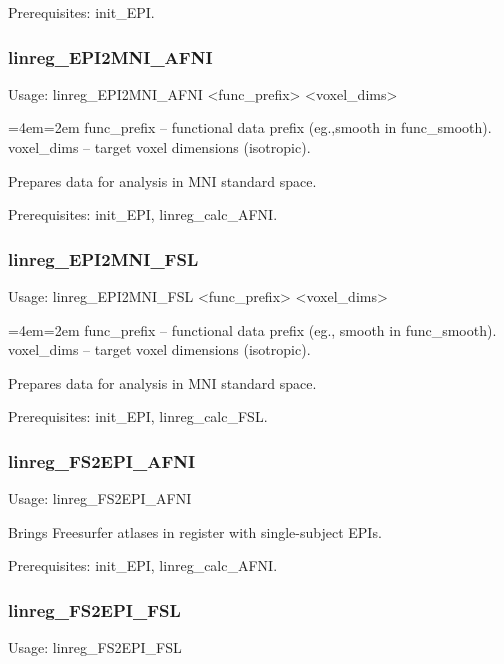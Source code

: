 \documentclass[final,titlepage,letterpaper,oneside,12pt]{article}
\renewcommand{\texttt}[2][BrickRed]{\textcolor{#1}{\ttfamily #2}}%
\newenvironment{blockquote}{%
  \par%
  \medskip
  \leftskip=4em\rightskip=2em%
  \noindent\ignorespaces}{%
  \par\medskip}
\begin{document}
Prerequisites: \texttt{init\_EPI}.

\subsubsection{linreg\_EPI2MNI\_AFNI}
Usage: \texttt{linreg\_EPI2MNI\_AFNI <func\_prefix> <voxel\_dims>}

\begin{blockquote}
func\_prefix -- functional data prefix (eg.,smooth in func\_smooth). \\
voxel\_dims -- target voxel dimensions (isotropic). \
\end{blockquote}

\noindent Prepares data for analysis in MNI standard space.

Prerequisites: \texttt{init\_EPI}, \texttt{linreg\_calc\_AFNI}.

\subsubsection{linreg\_EPI2MNI\_FSL}
Usage: \texttt{linreg\_EPI2MNI\_FSL <func\_prefix> <voxel\_dims>}

\begin{blockquote}
func\_prefix -- functional data prefix (eg., smooth in func\_smooth). \\
voxel\_dims -- target voxel dimensions (isotropic). \
\end{blockquote}

\noindent Prepares data for analysis in MNI standard space.

Prerequisites: \texttt{init\_EPI}, \texttt{linreg\_calc\_FSL}.

\subsubsection{linreg\_FS2EPI\_AFNI}
Usage: \texttt{linreg\_FS2EPI\_AFNI}

\noindent Brings Freesurfer atlases in register with single-subject EPIs.

Prerequisites: \texttt{init\_EPI}, \texttt{linreg\_calc\_AFNI}.

\subsubsection{linreg\_FS2EPI\_FSL}
Usage: \texttt{linreg\_FS2EPI\_FSL}
\end{document}
